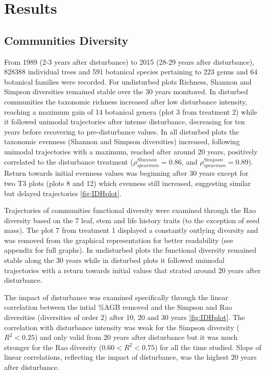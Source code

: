 \documentclass[fleqn,10pt]{ArtEcoFoG} %
\theoremstyle{definition}
\theoremstyle{definition}
\theoremstyle{definition}
\theoremstyle{remark}
\begin{document}
\section{Results}\label{results}

\subsection{Communities Diversity}\label{communities-diversity}

From 1989 (2-3 years after disturbance) to 2015 (28-29
years after disturbance), 828388 individual trees and 591 botanical species
pertaining to 223 genus and 64 botanical families were recorded.
For undisturbed plots Richness, Shannon and Simpson diversities remained
stable over the 30 years monitored. In disturbed communities the
taxonomic richness increased after low disturbance intensity, reaching a
maximum gain of 14 botanical genera (plot 3 from treatment 2) while it
followed unimodal trajectories after intense disturbance, decreasing for
ten years before recovering to pre-disturbance values. In all disturbed
plots the taxonomic evenness (Shannon and Simpson diversities)
increased, following unimodal trajectories with a maximum, reached after
around 20 years, positively correlated to the disturbance treatment
(\(\rho_{spearman}^{Shannon}=0.86\), and
\(\rho_{spearman}^{Simpson}=0.89\)). Return towards initial evenness
values was beginning after 30 years except for two T3 plots (plots 8 and
12) which evenness still increased, suggesting similar but delayed
trajectories \ref{fig:IDHplot}.

Trajectories of communities functional diversity were examined through
the Rao diversity based on the 7 leaf, stem and life history traits (to
the exception of seed mass). The plot 7 from treatment 1 displayed a
constantly outlying diversity and was removed from the graphical
representation for better readability (see appendix for full graphs). In
undisturbed plots the functional diversity remained stable along the 30
years while in disturbed plots it followed unimodal trajectories with a
return towards initial values that strated around 20 years after
disturbance.

The impact of disturbance was examined specifically through the linear
correlation between the intial \%AGB removed and the Simpson and Rao
diversities (diversities of order 2) after 10, 20 and 30 years
\ref{fig:IDHplot}. The correlation with disturbance intensity was weak
for the Simpson diversity (\(R^2<0.25\)) and only valid from 20 years
after disturbance but it was much stronger for the Rao diversity
(\(0.60<R^2<0.75\)) for all the time studied. Slope of linear
correlations, reflecting the impact of disturbance, was the highest 20
years after disturbance.
\end{document}
